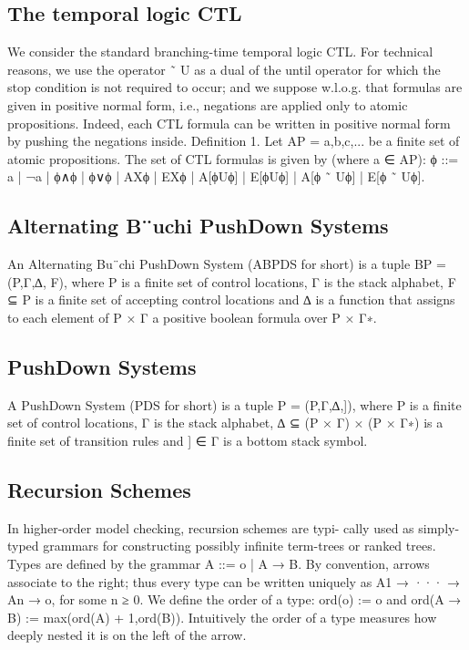 \documentclass[12pt,letterpaper]{article}
\begin{document}
{\subsection{The temporal logic CTL}
We consider the standard branching-time temporal logic CTL. For technical reasons, we use the operator ˜ U as a dual of the until operator for which the stop condition is not required to occur; and we suppose w.l.o.g. that formulas are given in positive normal form, i.e., negations are applied only to atomic propositions. Indeed, each CTL formula can be written in positive normal form by pushing the negations inside.
Deﬁnition 1. Let AP = {a,b,c,...} be a ﬁnite set of atomic propositions. The set of CTL formulas is given by (where a ∈ AP):
ϕ ::= a | ¬a | ϕ∧ϕ | ϕ∨ϕ | AXϕ | EXϕ | A[ϕUϕ] | E[ϕUϕ] | A[ϕ ˜ Uϕ] | E[ϕ ˜ Uϕ].
\subsection{Alternating B¨uchi PushDown Systems}
 An Alternating Bu¨chi PushDown System (ABPDS for short) is a tuple BP = (P,Γ,∆, F), where P is a ﬁnite set of control locations, Γ is the stack alphabet, F ⊆ P is a ﬁnite set of accepting control locations and ∆ is a function that assigns to each element of P × Γ a positive boolean formula over P × Γ∗.
\subsection{ PushDown Systems}
A PushDown System (PDS for short) is a tuple P = (P,Γ,∆,]), where P is a ﬁnite set of control locations, Γ is the stack alphabet, ∆ ⊆ (P × Γ) × (P × Γ∗) is a ﬁnite set of transition rules and ] ∈ Γ is a bottom stack symbol.
\subsection{Recursion Schemes}
In higher-order model checking, recursion schemes are typi- cally used as simply-typed grammars for constructing possibly inﬁnite term-trees or ranked trees. Types are deﬁned by the grammar A ::= o | A → B. By convention, arrows associate to the right; thus every type can be written uniquely as A1 → ··· → An → o, for some n ≥ 0. We deﬁne the order of a type: ord(o) := o and ord(A → B) := max(ord(A) + 1,ord(B)). Intuitively the order of a type measures how deeply nested it is on the left of the arrow. 

}
\end{document}

